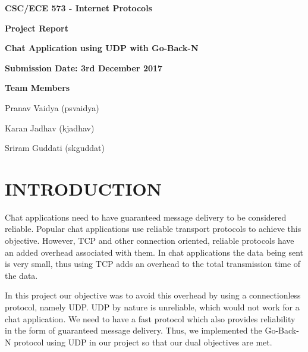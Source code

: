 \documentclass[10pt, pdftex, twocolumn]{report}
\begin{document}
	\begin{titlepage}
		\centering
		{\LARGE\bfseries CSC/ECE 573 - Internet Protocols}
		
		\vspace{1cm}
		
		{\Large\bfseries Project Report}
		
		\vspace{1cm}
		
		{\Large\bfseries Chat Application using UDP with Go-Back-N}
		
		\vspace{2cm}
		
		{\Large\bfseries Submission Date: 3rd December 2017}		
		
		\vspace{2cm}
		
		{\Large\bfseries Team Members}
		
		\vspace{0.5cm}
		
		{\Large Pranav Vaidya (psvaidya)}
		
		\vspace{0.5cm}
		
		{\Large Karan Jadhav (kjadhav)}
		
		\vspace{0.5cm}
		
		{\Large Sriram Guddati (skguddat)}
		
	\end{titlepage}
	
	\section*{INTRODUCTION}
	Chat applications need to have guaranteed message delivery to be considered reliable. Popular chat applications use reliable transport protocols to achieve this objective. However, TCP and other connection oriented, reliable protocols have an added overhead associated with them. In chat applications the data being sent is very small, thus using TCP adds an overhead to the total transmission time of the data.
	
	In this project our objective was to avoid this overhead by using a connectionless protocol, namely UDP. UDP by nature is unreliable, which would not work for a chat application. We need to have a fast protocol which also provides reliability in the form of guaranteed message delivery. Thus, we implemented the Go-Back-N protocol using UDP in our project so that our dual objectives are met.
	
\end{document}
